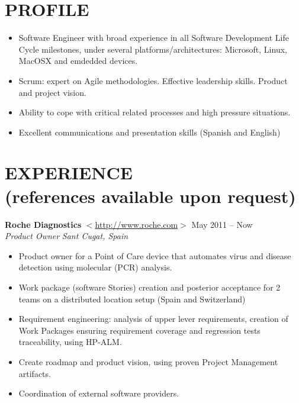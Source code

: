 \documentclass[line,margin]{res}
\begin{document}
\address{+34 678714822 / roberlamerma@gmail.com}

\begin{resume}
 
\section{PROFILE}       
                \begin{itemize}  \itemsep 2pt 
                \item Software Engineer with broad experience in all Software 
                Development Life Cycle milestones, under several platforms/architectures: Microsoft, Linux, MacOSX and emdedded devices.
                \item Scrum: expert on Agile methodologies. Effective leadership skills. Product and project vision.
                \item Ability to cope with critical related processes and high 
                pressure situations.              
                \item Excellent communications and presentation skills (Spanish and English)
                \end{itemize}
         

\section{EXPERIENCE \\ \footnotesize{(references available upon request)}}

                \textbf{Roche Diagnostics} 
                $<$\url{http://www.roche.com}$>$ \hfill May 2011 -- Now \\
                {\sl Product Owner} \hfill \textit{Sant Cugat, Spain}
                \begin{itemize}  \itemsep 2pt 
                \item Product owner for a Point of Care device that automates virus and disease detection using molecular (PCR) analysis.
                \item Work package (software Stories) creation and posterior acceptance for 2 teams on a distributed location setup (Spain and Switzerland)
                \item Requirement engineering: analysis of upper lever requirements, creation of 
                Work Packages ensuring requirement coverage and regression tests traceability, using HP-ALM.
                \item Create roadmap and product vision, using proven Project Management artifacts.
                \item Coordination of external software providers.
                \end{itemize}


\end{resume}
\end{document}
